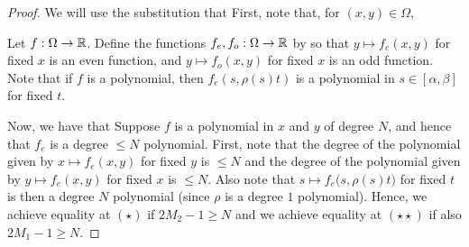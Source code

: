 \begin{proof}
We will use the substitution that
First, note that, for $(x,y) \in \Omega$,

Let $f : \Omega \to \mathbb{R}$. Define the functions $f_e, f_o : \Omega \to \mathbb{R}$ by 
so that $y \mapsto f_e(x,y)$ for fixed $x$ is an even function, and $y \mapsto f_o(x,y)$ for fixed $x$ is an odd function. Note that if $f$ is a polynomial, then $f_e(s, \rho(s)t)$ is a polynomial in $s \in [\alpha,\beta]$ for fixed $t$. 

Now, we have that
Suppose $f$ is a polynomial in $x$ and $y$ of degree $N$, and hence that $f_e$ is a degree $\le N$ polynomial. First, note that the degree of the polynomial given by $x \mapsto f_e(x,y)$ for fixed $y$ is $\le N$ and the degree of the polynomial given by $y \mapsto f_e(x,y)$ for fixed $x$ is $\le N$. Also note that $s \mapsto f_e\big(s,\rho(s) t\big)$ for fixed $t$ is then a degree $N$ polynomial (since $\rho$ is a degree $1$ polynomial). Hence, we achieve equality at $(\star)$ if $2M_2 - 1 \ge N$ and we achieve equality at $(\star \star)$ if also $2M_1 - 1 \ge N$.


\end{proof}
